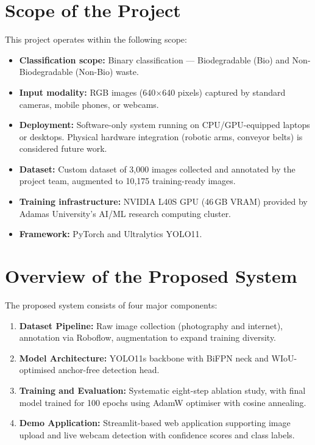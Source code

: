 \section{Scope of the Project}

This project operates within the following scope:

\begin{itemize}
    \item \textbf{Classification scope:} Binary classification — Biodegradable (Bio) and Non-Biodegradable (Non-Bio) waste.
    \item \textbf{Input modality:} RGB images (640$\times$640 pixels) captured by standard cameras, mobile phones, or webcams.
    \item \textbf{Deployment:} Software-only system running on CPU/GPU-equipped laptops or desktops. Physical hardware integration (robotic arms, conveyor belts) is considered future work.
    \item \textbf{Dataset:} Custom dataset of 3,000 images collected and annotated by the project team, augmented to 10,175 training-ready images.
    \item \textbf{Training infrastructure:} NVIDIA L40S GPU (46\,GB VRAM) provided by Adamas University's AI/ML research computing cluster.
    \item \textbf{Framework:} PyTorch and Ultralytics YOLO11.
\end{itemize}

\section{Overview of the Proposed System}

The proposed system consists of four major components:

\begin{enumerate}
    \item \textbf{Dataset Pipeline:} Raw image collection (photography and internet), annotation via Roboflow, augmentation to expand training diversity.
    \item \textbf{Model Architecture:} YOLO11s backbone with BiFPN neck and WIoU-optimised anchor-free detection head.
    \item \textbf{Training and Evaluation:} Systematic eight-step ablation study, with final model trained for 100 epochs using AdamW optimiser with cosine annealing.
    \item \textbf{Demo Application:} Streamlit-based web application supporting image upload and live webcam detection with confidence scores and class labels.
\end{enumerate}

